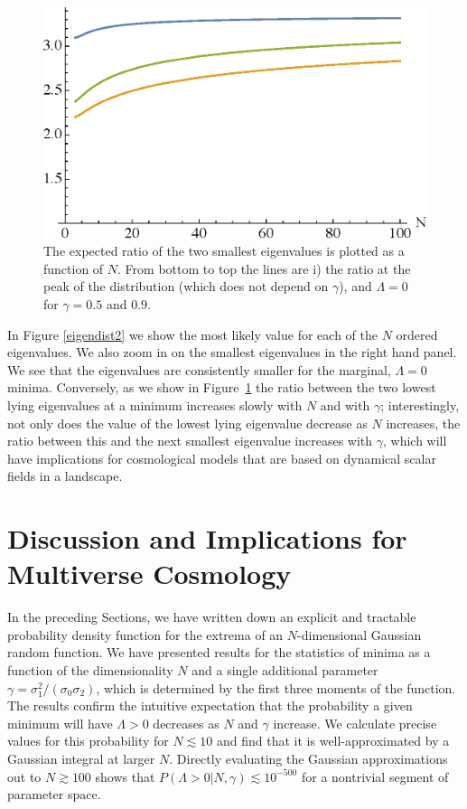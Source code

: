 \documentclass[12pt]{article}
\begin{document}
\begin{figure} 
  \centering
  \includegraphics[width=.6\linewidth]{ratio.eps}  
  \caption{The expected ratio of the two smallest eigenvalues is plotted as a function of $N$.   From bottom to top the lines are i) the ratio at the peak  of the distribution (which does not depend on $\gamma$), and $\Lambda=0$ for $\gamma =0.5$ and $0.9$.}
  \label{ratio}
\end{figure}


In Figure \ref{eigendist2} we show the most likely value for each of the $N$ ordered eigenvalues. We also zoom in on the smallest eigenvalues in the right hand panel. We see that the eigenvalues are consistently smaller for the marginal, $\Lambda=0$ minima. 
Conversely, as we show in Figure~\ref{ratio} the ratio between the two lowest lying eigenvalues at a minimum increases slowly with $N$ and with $\gamma$; interestingly, not only does the value of the lowest lying eigenvalue decrease as  $N$ increases, the ratio between this and the next smallest eigenvalue increases with $\gamma$, which will have implications for cosmological models that are based on dynamical scalar fields in a landscape. 





 
\section{Discussion and Implications for Multiverse Cosmology}

In the preceding Sections, we have  written down an explicit and tractable probability density function for the extrema of an $N$-dimensional  Gaussian random function. We have presented results for the statistics of minima as a function of the dimensionality $N$ and a single additional parameter $\gamma=\sigma_1^2/(\sigma_0\sigma_2)$, which is determined by the first three moments of the function. The results confirm the intuitive expectation that the probability a given minimum will have $\Lambda > 0$ decreases as $N$ and $\gamma$ increase. We calculate precise values for this probability for $N \lesssim10$ and find that it is well-approximated by a Gaussian integral at larger $N$. Directly evaluating the Gaussian approximations out to $N \gtrsim 100$ shows that $P(\Lambda > 0| N, \gamma) \lesssim 10^{-500}$ for a nontrivial segment of parameter space.
\end{document}

